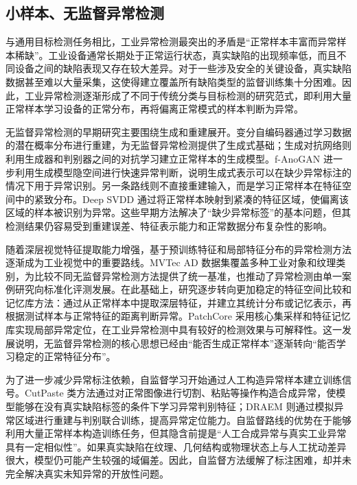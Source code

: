 \subsection{小样本、无监督异常检测}

与通用目标检测任务相比，工业异常检测最突出的矛盾是“正常样本丰富而异常样本稀缺”。工业设备通常长期处于正常运行状态，真实缺陷的出现频率低，而且不同设备之间的缺陷表现又存在较大差异。对于一些涉及安全的关键设备，真实缺陷数据甚至难以大量采集，这使得建立覆盖所有缺陷类型的监督训练集十分困难。因此，工业异常检测逐渐形成了不同于传统分类与目标检测的研究范式，即利用大量正常样本学习设备的正常分布，再将偏离正常模式的样本判断为异常\cite{taox2021survey,pang2021deep}。

无监督异常检测的早期研究主要围绕生成和重建展开。变分自编码器通过学习数据的潜在概率分布进行重建，为无监督异常检测提供了生成式基础\cite{kingma2014auto}；生成对抗网络则利用生成器和判别器之间的对抗学习建立正常样本的生成模型\cite{goodfellow2014generative}。f-AnoGAN 进一步利用生成模型隐空间进行快速异常判断，说明生成式表示可以在缺少异常标注的情况下用于异常识别\cite{fangan2019}。另一条路线则不直接重建输入，而是学习正常样本在特征空间中的紧致分布。Deep SVDD 通过将正常样本映射到紧凑的特征区域，使偏离该区域的样本被识别为异常\cite{ruff2018deep}。这些早期方法解决了“缺少异常标签”的基本问题，但其检测结果仍容易受到重建误差、特征表示能力和正常数据分布复杂性的影响。

随着深层视觉特征提取能力增强，基于预训练特征和局部特征分布的异常检测方法逐渐成为工业视觉中的重要路线。MVTec AD 数据集覆盖多种工业对象和纹理类别，为比较不同无监督异常检测方法提供了统一基准，也推动了异常检测由单一案例研究向标准化评测发展\cite{bergmann2019mvtec}。在此基础上，研究逐步转向更加稳定的特征空间比较和记忆库方法：通过从正常样本中提取深层特征，并建立其统计分布或记忆表示，再根据测试样本与正常特征的距离判断异常。PatchCore 采用核心集采样和特征记忆库实现局部异常定位，在工业异常检测中具有较好的检测效果与可解释性\cite{roth2022towards}。这一发展说明，无监督异常检测的核心思想已经由“能否生成正常样本”逐渐转向“能否学习稳定的正常特征分布”。

为了进一步减少异常标注依赖，自监督学习开始通过人工构造异常样本建立训练信号。CutPaste 类方法通过对正常图像进行切割、粘贴等操作构造合成异常，使模型能够在没有真实缺陷标签的条件下学习异常判别特征；DRAEM 则通过模拟异常区域进行重建与判别联合训练，提高异常定位能力\cite{zavrtanik2021draem}。自监督路线的优势在于能够利用大量正常样本构造训练任务，但其隐含前提是“人工合成异常与真实工业异常具有一定相似性”。如果真实缺陷在纹理、几何结构或物理状态上与人工扰动差异很大，模型仍可能产生较强的域偏差。因此，自监督方法缓解了标注困难，却并未完全解决真实未知异常的开放性问题。

